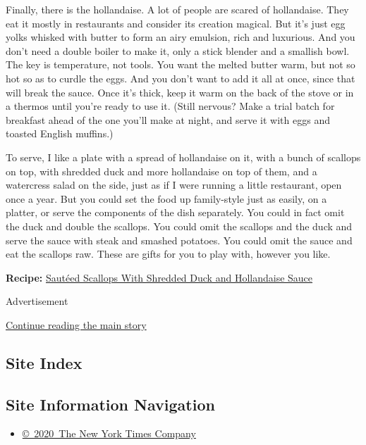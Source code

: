 Finally, there is the hollandaise. A lot of people are scared of
hollandaise. They eat it mostly in restaurants and consider its creation
magical. But it's just egg yolks whisked with butter to form an airy
emulsion, rich and luxurious. And you don't need a double boiler to make
it, only a stick blender and a smallish bowl. The key is temperature,
not tools. You want the melted butter warm, but not so hot so as to
curdle the eggs. And you don't want to add it all at once, since that
will break the sauce. Once it's thick, keep it warm on the back of the
stove or in a thermos until you're ready to use it. (Still nervous? Make
a trial batch for breakfast ahead of the one you'll make at night, and
serve it with eggs and toasted English muffins.)

To serve, I like a plate with a spread of hollandaise on it, with a
bunch of scallops on top, with shredded duck and more hollandaise on top
of them, and a watercress salad on the side, just as if I were running a
little restaurant, open once a year. But you could set the food up
family-style just as easily, on a platter, or serve the components of
the dish separately. You could in fact omit the duck and double the
scallops. You could omit the scallops and the duck and serve the sauce
with steak and smashed potatoes. You could omit the sauce and eat the
scallops raw. These are gifts for you to play with, however you like.

\textbf{Recipe:}
\href{https://cooking.nytimes3xbfgragh.onion/recipes/1019117-sauteed-scallops-with-shredded-duck-and-hollandaise-sauce}{Sautéed
Scallops With Shredded Duck and Hollandaise Sauce}

Advertisement

\protect\hyperlink{after-bottom}{Continue reading the main story}

\hypertarget{site-index}{%
\subsection{Site Index}\label{site-index}}

\hypertarget{site-information-navigation}{%
\subsection{Site Information
Navigation}\label{site-information-navigation}}

\begin{itemize}
\tightlist
\item
  \href{https://help.nytimes3xbfgragh.onion/hc/en-us/articles/115014792127-Copyright-notice}{©~2020~The
  New York Times Company}
\end{itemize}

